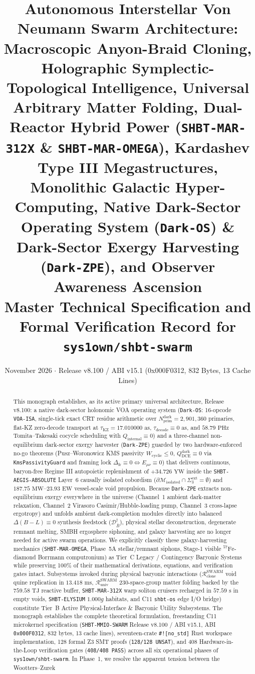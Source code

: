 \documentclass[11pt,onecolumn]{article}
\title{\textbf{Autonomous Interstellar Von Neumann Swarm Architecture: Macroscopic Anyon-Braid Cloning, Holographic Symplectic-Topological Intelligence, Universal Arbitrary Matter Folding, Dual-Reactor Hybrid Power (\texttt{SHBT-MAR-312X} \& \texttt{SHBT-MAR-OMEGA}), Kardashev Type III Megastructures, Monolithic Galactic Hyper-Computing, Native Dark-Sector Operating System (\texttt{Dark-OS}) \& Dark-Sector Exergy Harvesting (\texttt{Dark-ZPE}), and Observer Awareness Ascension}\\[0.3em]\large Master Technical Specification and Formal Verification Record for \texttt{sys1own/shbt-swarm}}
\author{}
\date{November 2026 \quad $\cdot$ \quad Release v8.100 / ABI v15.1 (0x000F0312, 832 Bytes, 13 Cache Lines)}
\begin{document}
\maketitle

\begin{abstract}
This monograph establishes, as its active primary universal architecture, Release v8.100: a native dark-sector holonomic VOA operating system (\texttt{Dark-OS}: 16-opcode \texttt{VOA-ISA}, single-tick exact CRT residue arithmetic over $N_{\text{prim}}^{\text{dark}}=2{,}901{,}360$ primaries, flat-KZ zero-decode transport at $\tau_{\text{KZ}}=17.010000\text{ as}$, $\tau_{\text{decode}}\equiv0\text{ as}$, and $58.79\text{ PHz}$ Tomita--Takesaki cocycle scheduling with $Q_{\text{internal}}\equiv0$) and a three-channel non-equilibrium dark-sector exergy harvester (\texttt{Dark-ZPE}) guarded by two hardware-enforced no-go theorems (Pusz--Woronowicz KMS passivity $W_{\text{cyclic}}\le0$, $Q_{\text{DCE}}^{\text{dark}}\equiv0$ via \texttt{KmsPassivityGuard} and framing lock $\Delta_{\text{fr}}\equiv0\iff E_{\mu\nu}\equiv0$) that delivers continuous, baryon-free Regime III autopoietic replenishment of $+34.726\text{ YW}$ inside the \texttt{SHBT-AEGIS-ABSOLUTE} Layer~6 causally isolated cobordism ($\partial\mathcal{M}_{\text{isolated}}\cap\Sigma_3^{\text{ext}}=\emptyset$) and $187.75\text{ MW}$--$23.93\text{ EW}$ vessel-scale void propulsion. Because \texttt{Dark-ZPE} extracts non-equilibrium exergy everywhere in the universe (Channel~1 ambient dark-matter relaxation, Channel~2 Virasoro Casimir/Hubble-loading pump, Channel~3 cross-lapse ergotropy) and unfolds ambient dark-completion modules directly into balanced $\Delta(B-L)\equiv0$ synthesis feedstock ($\mathcal{D}_{\bar{B}}^\dagger$), physical stellar deconstruction, degenerate remnant melting, SMBH ergosphere siphoning, and galaxy harvesting are no longer needed for active swarm operations. We explicitly classify these galaxy-harvesting mechanics (\texttt{SHBT-MAR-OMEGA}, Phase~5A stellar/remnant siphons, Stage-1 visible $^{57}\text{Fe}$-diamond Borrmann computronium) as Tier~C Legacy / Contingency Baryonic Systems while preserving 100\% of their mathematical derivations, equations, and verification gates intact. Subsystems invoked during physical baryonic interactions ($\mathcal{R}_{\text{clone}}^{\text{SWARM}}$ void quine replication in $13.418\text{ ms}$, $\mathcal{R}_{\text{univ}}^{\text{SWARM}}$ 230-space-group matter folding backed by the $759.58\text{ TJ}$ reactive buffer, \texttt{SHBT-MAR-312X} warp soliton cruisers recharged in $57.59\text{ s}$ in empty voids, \texttt{SHBT-ELYSIUM} $1.000g$ habitats, and C11 \texttt{shbt-os} edge I/O bridge) constitute Tier~B Active Physical-Interface \& Baryonic Utility Subsystems. The monograph establishes the complete theoretical formulation, freestanding C11 microkernel specification (\texttt{SHBT-MMIO-SWARM} Release v8.100 / ABI v15.1, ABI \texttt{0x000F0312}, 832 bytes, 13 cache lines), seventeen-crate \texttt{\#![no\_std]} Rust workspace implementation, 128 formal Z3 SMT proofs (\texttt{128/128 UNSAT}), and 408 Hardware-in-the-Loop verification gates (\texttt{408/408 PASS}) across all six operational phases of \texttt{sys1own/shbt-swarm}. In Phase~1, we resolve the apparent tension between the Wootters--Zurek 
\end{abstract}
\end{document}
